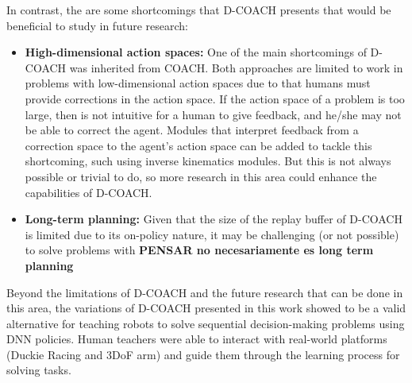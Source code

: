 \begin{conclusion}
In contrast, the are some shortcomings that D-COACH presents that would be beneficial to study in future research:
\begin{itemize}
    \item \textbf{High-dimensional action spaces:} One of the main shortcomings of D-COACH was inherited from COACH. Both approaches are limited to work in problems with low-dimensional action spaces due to that humans must provide corrections in the action space. If the action space of a problem is too large, then is not intuitive for a human to give feedback, and he/she may not be able to correct the agent. Modules that interpret feedback from a correction space to the agent's action space can be added to tackle this shortcoming, such using inverse kinematics modules. But this is not always possible or trivial to do, so more research in this area could  enhance the capabilities of D-COACH.
    \item \textbf{Long-term planning:} Given that the size of the replay buffer of D-COACH is limited due to its on-policy nature, it may be challenging (or not possible) to solve problems with \textbf{PENSAR no necesariamente es long term planning}
\end{itemize}

Beyond the limitations of D-COACH and the future research that can be done in this area, the variations of D-COACH presented in this work showed to be a valid alternative for teaching robots to solve sequential decision-making problems using DNN policies. Human teachers were able to interact with real-world platforms (Duckie Racing and 3DoF arm) and guide them through the learning process for solving tasks.
\end{conclusion}
